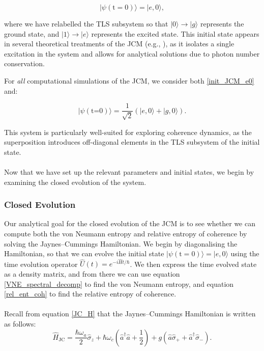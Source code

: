 \documentclass[12pt]{article}
\begin{document}
\begin{equation} \label{init_JCM_e0}
    |\psi (\text{t}=0)\rangle = |e, 0\rangle,
\end{equation}

where we have relabelled the TLS subsystem so that $|0\rangle \rightarrow|g\rangle$ represents the ground state, and $|1\rangle \rightarrow |e\rangle$ represents the excited state. This initial state appears in several theoretical treatments of the JCM (e.g., \cite{Entanglement2009-REE_VNapplied}), as it isolates a single excitation in the system and allows for analytical solutions due to photon number conservation.

For \textit{all} computational simulations of the JCM, we consider both \eqref{init_JCM_e0} and:

\begin{equation}
    |\psi (\text{t=0})\rangle = \frac{1}{\sqrt{2}}(|e, 0\rangle + |g,0\rangle).
\end{equation}

This system is particularly well-suited for exploring coherence dynamics, as the superposition introduces off-diagonal elements in the TLS subsystem of the initial state.\\
\\
Now that we have set up the relevant parameters and initial states, we begin by examining the closed evolution of the system.

\subsubsection{Closed Evolution}

Our analytical goal for the closed evolution of the JCM is to see whether we can compute both the von Neumann entropy and relative entropy of coherence by solving the Jaynes--Cummings Hamiltonian. We begin by diagonalising the Hamiltonian, so that we can evolve the initial state $|\psi (\text{t}=0)\rangle = |e, 0\rangle$ using the time evolution operator $\hat{U}(t) = e^{-i\hat{H}t/\hbar}$. We then express the time evolved state as a density matrix, and from there we can use equation \eqref{VNE_spectral_decomp} to find the von Neumann entropy, and equation \eqref{rel_ent_coh} to find the relative entropy of coherence.\\
\\
Recall from equation \eqref{JC_H} that the Jaynes--Cummings Hamiltonian is written as follows:
\begin{equation*}
        \hat{H}_{\scriptscriptstyle \text{JC}} = \frac{\hbar\omega_a}{2}\hat{\sigma}_z + \hbar\omega_c\left(\hat{a}^\dagger \hat{a} + \frac{1}{2} \right) + g(\hat{a}\hat{\sigma}_{+} + \hat{a}^\dagger\hat{\sigma}_{-}).
\end{equation*}
\end{document}
